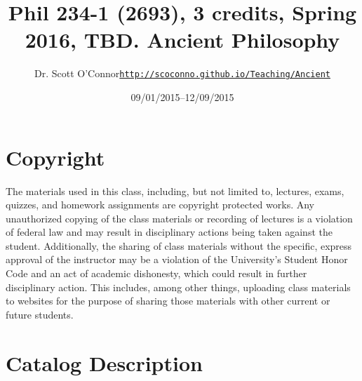 \documentclass[article,oneside]{memoir}
\def\myauthor{Author}
\def\mytitle{Title}
\def\mycopyright{\myauthor}
\def\myweb{\href{http://scoconno.github.io/Teaching/Ancient}{http://scoconno.github.io/Teaching/Ancient}}
\def\myauthor{Dr. Scott O'Connor}
\def\mytitle{{\normalsize Phil 234-1 (2693), 3 credits, Spring 2016, TBD. \newline} \HUGE Ancient Philosophy}
\begin{document}
\setsansfont[Mapping=tex-text]{Minion Pro} 
\setmonofont[Mapping=tex-text,Scale=0.8]{Minion Pro} 

\def\ind{\hangindent=1 true cm\hangafter=1 \noindent}
\def\labelitemi{$\cdot$}


\title{\LARGE \mytitle}     
\author{\Large\myauthor \newline \footnotesize\texttt{\noindent\myweb}}
\date{09/01/2015--12/09/2015}

\published{\today}

\maketitle




%
%

\section{Copyright}
The materials used in this class, including, but not limited to, lectures, exams, quizzes, and homework assignments are copyright protected works.  Any unauthorized copying of the class materials or recording of lectures is a violation of federal law and may result in disciplinary actions being taken against the student.  Additionally, the sharing of class materials without the specific, express approval of the instructor may be a violation of the University's Student Honor Code and an act of academic dishonesty, which could result in further disciplinary action.  This includes, among other things, uploading class materials to websites for the purpose of sharing those materials with other current or future students. 

\section{Catalog Description}
\end{document}
